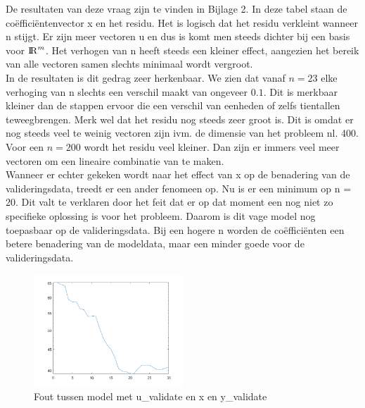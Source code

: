 De resultaten van deze vraag zijn te vinden in Bijlage 2. In deze tabel staan de co\"effici\"entenvector x en het residu. Het is logisch dat het residu verkleint wanneer n stijgt. Er zijn meer vectoren u en dus is komt men steeds dichter bij een basis voor ${\rm I\!R}^{m}$. Het verhogen van n heeft steeds een kleiner effect, aangezien het bereik van alle vectoren samen slechts minimaal wordt vergroot. \\[12pt]

In de resultaten is dit gedrag zeer herkenbaar. We zien dat vanaf $n = 23$ elke verhoging van n slechts een verschil maakt van ongeveer $0.1$. Dit is merkbaar kleiner dan de stappen ervoor die een verschil van eenheden of zelfs tientallen teweegbrengen. Merk wel dat het residu nog steeds zeer groot is. Dit is omdat er nog steeds veel te weinig vectoren zijn ivm. de dimensie van het probleem nl. 400. Voor een $n = 200$ wordt het residu veel kleiner. Dan zijn er immers veel meer vectoren om een lineaire combinatie van te maken.\\[12pt]

Wanneer er echter gekeken wordt naar het effect van x op de benadering van de valideringsdata, treedt er een ander fenomeen op. Nu is er een minimum op n = 20. Dit valt te verklaren door het feit dat er op dat moment een nog niet zo specifieke oplossing is voor het probleem. Daarom is dit vage model nog toepasbaar op de valideringsdata. Bij een hogere n worden de co\"effici\"enten een betere benadering van de modeldata, maar een minder goede voor de valideringsdata.\\

\begin{figure}[H]
  \centering
  \includegraphics[width=0.5\textwidth]{Tekeningen/LeastSquare_Validate.png}
  \caption{Fout tussen model met u\_validate en x en y\_validate}
\end{figure}


